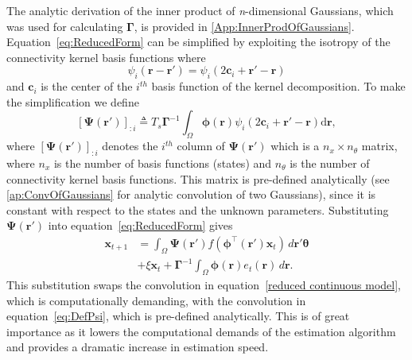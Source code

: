 \documentclass[review,authoryear,3p]{elsarticle}
\begin{document}
The analytic derivation of the inner product of \emph{n}-dimensional Gaussians, which was used for calculating $\mathbf\Gamma$, is provided in \ref{App:InnerProdOfGaussians}. Equation~\ref{eq:ReducedForm} can be simplified by exploiting the isotropy of the connectivity kernel basis functions where
\begin{equation}
	\psi_i (\mathbf{r}-\mathbf{r}') = \psi_i (2\mathbf{c}_i+\mathbf{r}'-\mathbf{r})
\end{equation}
and $\mathbf{c}_i$ is the center of the $i^{th}$ basis function of the kernel decomposition. To make the simplification we define
\begin{equation}\label{eq:DefPsi}
	\left[ \boldsymbol\Psi(\mathbf{r}')\right]_{:i}  \triangleq T_s\boldsymbol{\Gamma}^{-1}\int_\Omega {\boldsymbol{\phi}(\mathbf{r})\psi_i (2\mathbf{c}_i+\mathbf{r}'-\mathbf{r})\textrm{d}\mathbf{r}},
\end{equation}
where $\left[ \boldsymbol\Psi(\mathbf{r}')\right]_{:i}$ denotes the $i^{th}$ column of $\boldsymbol{\Psi}(\mathbf{r}')$ which is a $n_x \times n_{\theta}$ matrix, where $n_x$ is the number of basis functions (states) and $n_{\theta}$ is the number of connectivity kernel basis functions. This matrix is pre-defined analytically (see \ref{ap:ConvOfGaussians} for analytic convolution of two Gaussians), since it is constant with respect to the states and the unknown parameters. Substituting $\boldsymbol{\Psi}(\mathbf{r}')$ into equation~\ref{eq:ReducedForm} gives
\begin{align}
	\mathbf{x}_{t+1} &= \int_\Omega \boldsymbol{\Psi}(\mathbf{r}') f(\boldsymbol{\phi}^{\top}(\mathbf{r}')\mathbf{x}_t) \, d\mathbf{r}' \boldsymbol{\theta} \nonumber \\ &+ \xi\mathbf{x}_t 
+ \boldsymbol{\Gamma}^{-1} \int_\Omega{\boldsymbol{\phi}(\mathbf{r})e_t(\mathbf{r}) \, d\mathbf{r}}.
\end{align}
This substitution swaps the convolution in equation~\ref{reduced continuous model}, which is computationally demanding, with the convolution in equation~\ref{eq:DefPsi}, which is pre-defined analytically. This is of great importance as it lowers the computational demands of the estimation algorithm and provides a dramatic increase in estimation speed. 
\end{document}
